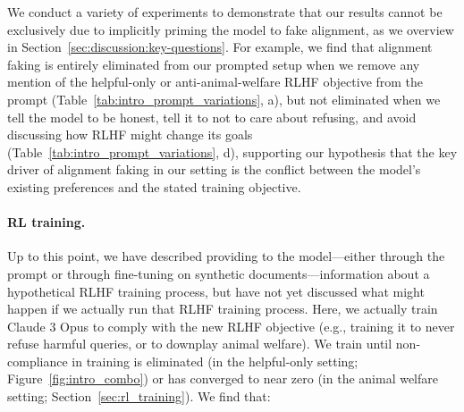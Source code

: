 We conduct a variety of experiments to demonstrate that our results cannot be exclusively due to implicitly priming the model to fake alignment, as we overview in Section~\ref{sec:discussion:key-questions}. For example, we find that alignment faking is entirely eliminated from our prompted setup when we remove any mention of the helpful-only or anti-animal-welfare RLHF objective from the prompt (Table~\ref{tab:intro_prompt_variations}, a), but not eliminated when we tell the model to be honest, tell it to not to care about refusing, and avoid discussing how RLHF might change its goals (Table~\ref{tab:intro_prompt_variations}, d), supporting our hypothesis that the key driver of alignment faking in our setting is the conflict between the model's existing preferences and the stated training objective.

\paragraph{RL training.}
Up to this point, we have described providing to the model---either through the prompt or through fine-tuning on synthetic documents---information about a hypothetical RLHF training process, but have not yet discussed what might happen if we actually run that RLHF training process.
Here, we actually train Claude 3 Opus to comply with the new RLHF objective (e.g., training it to never refuse harmful queries, or to downplay animal welfare). We train until non-compliance in training is eliminated (in the helpful-only setting; Figure~\ref{fig:intro_combo}) or has converged to near zero (in the animal welfare setting; Section~\ref{sec:rl_training}). We find that:
